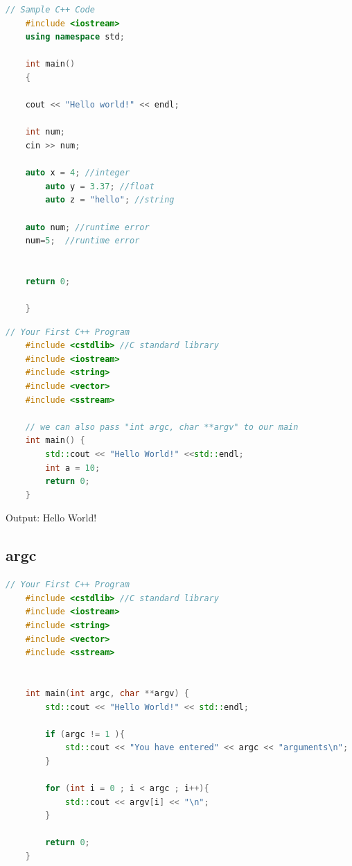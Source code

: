 \documentclass[12pt , a4paper]{article}
\begin{document}
	\begin{lstlisting}[language=C++]
	// Sample C++ Code
	#include <iostream>
	using namespace std;
	
	int main()
	{
	
	cout << "Hello world!" << endl;
	
	int num;
	cin >> num;

	auto x = 4; //integer
    	auto y = 3.37; //float
    	auto z = "hello"; //string 

	auto num; //runtime error
	num=5;  //runtime error


	return 0;

	} 
	\end{lstlisting}
	\begin{lstlisting}[language=C++]
	// Your First C++ Program
	#include <cstdlib> //C standard library
	#include <iostream>
	#include <string>
	#include <vector>
	#include <sstream>
	
	// we can also pass "int argc, char **argv" to our main
	int main() {
	    std::cout << "Hello World!" <<std::endl;
	    int a = 10;
	    return 0;
	}
	\end{lstlisting}
	
	
	\begin{tcolorbox}
	Output:
	Hello World!
	\end{tcolorbox}

	\subsection{argc}
	\begin{lstlisting}[language=C++]
	// Your First C++ Program
	#include <cstdlib> //C standard library
	#include <iostream>
	#include <string>
	#include <vector>
	#include <sstream>
	
	
	int main(int argc, char **argv) {
	    std::cout << "Hello World!" << std::endl;
	
	    if (argc != 1 ){
	        std::cout << "You have entered" << argc << "arguments\n";
	    }
	
	    for (int i = 0 ; i < argc ; i++){
	        std::cout << argv[i] << "\n";
	    }
	
	    return 0;
	}
	\end{lstlisting}
\end{document}
